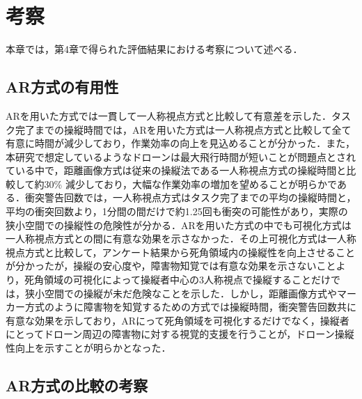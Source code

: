 \documentclass
[a4paper,11pt]{jreport}
\begin{document}
\chapter{考察}

本章では，第4章で得られた評価結果における考察について述べる．
\section{AR方式の有用性}
ARを用いた方式では一貫して一人称視点方式と比較して有意差を示した．タスク完了までの操縦時間では，ARを用いた方式は一人称視点方式と比較して全て有意に時間が減少しており，作業効率の向上を見込めることが分かった．また，本研究で想定しているようなドローンは最大飛行時間が短いことが問題点とされている中で，距離画像方式は従来の操縦法である一人称視点方式の操縦時間と比較して約30\% 減少しており，大幅な作業効率の増加を望めることが明らかである．衝突警告回数では，一人称視点方式はタスク完了までの平均の操縦時間と，平均の衝突回数より，1分間の間だけで約1.25回も衝突の可能性があり，実際の狭小空間での操縦性の危険性が分かる．ARを用いた方式の中でも可視化方式は一人称視点方式との間に有意な効果を示さなかった．その上可視化方式は一人称視点方式と比較して，アンケート結果から死角領域内の操縦性を向上させることが分かったが，操縦の安心度や，障害物知覚では有意な効果を示さないことより，死角領域の可視化によって操縦者中心の3人称視点で操縦することだけでは，狭小空間での操縦が未だ危険なことを示した．しかし，距離画像方式やマーカー方式のように障害物を知覚するための方式では操縦時間，衝突警告回数共に有意な効果を示しており，ARにって死角領域を可視化するだけでなく，操縦者にとってドローン周辺の障害物に対する視覚的支援を行うことが，ドローン操縦性向上を示すことが明らかとなった．
\section{AR方式の比較の考察}
\end{document}
